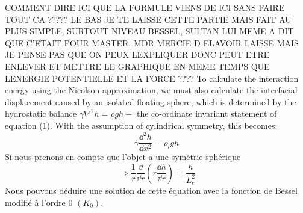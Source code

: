 


        COMMENT DIRE ICI QUE LA FORMULE VIENS DE ICI SANS FAIRE TOUT CA ????? LE BAS
        JE TE LAISSE CETTE PARTIE MAIS FAIT AU PLUS SIMPLE, SURTOUT NIVEAU BESSEL, SULTAN LUI MEME A DIT QUE C'ETAIT POUR MASTER. MDR MERCIE D ELAVOIR LAISSE MAIS JE PENSE PAS QUE ON PEUX LEXPLIQUER DONC PEUT ETRE ENLEVER ET METTRE LE GRAPHIQUE EN MEME TEMPS QUE LENERGIE POTENTIELLE ET LA FORCE ????
        To calculate the interaction energy using the Nicolson approximation, we must also calculate the interfacial displacement caused by an isolated floating sphere, which is determined by the hydrostatic balance \(\gamma\nabla^2h = \rho gh -\) the co-ordinate invariant statement of equation (1). With the assumption of cylindrical symmetry, this becomes:
        \begin{equation}
            \gamma \frac{\dd^2h}{\dd x^2} = \rho_l g h
        \end{equation}
        Si nous prenons en compte que l'objet a une symétrie sphérique
        \begin{equation}
            \Rightarrow \frac{1}{r} \frac{\dd}{\dd r} \left( r\frac{\dd h}{\dd r}\right) = \frac{h}{L_c^2}
        \end{equation}
        Nous pouvons déduire une solution de cette équation avec la fonction de Bessel modifié à l'ordre 0 $(K_0)$\cite{introtoBessel}.

